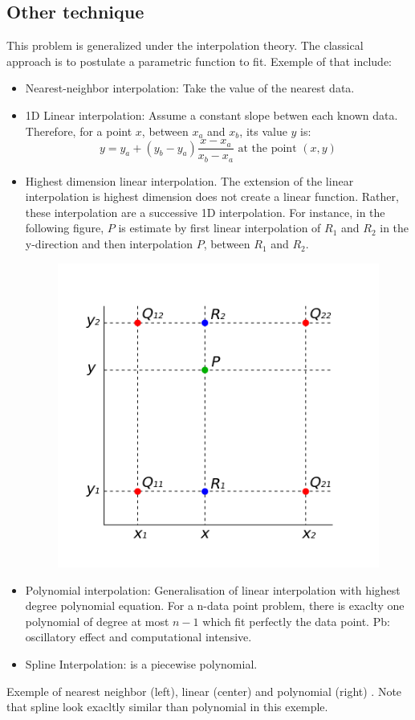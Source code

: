 \documentclass[twocolumn]{article}
\numberwithin{equation}{section}
\begin{document}
\subsection{Other technique}
This problem is generalized under the interpolation theory. The classical approach is to postulate a parametric function to fit. Exemple of that include:
\begin{itemize}
\item Nearest-neighbor interpolation: Take the value of the nearest data.
\item 1D Linear interpolation: Assume a constant slope betwen each known data. Therefore, for a point $x$, between $x_a$ and $x_b$, its value $y$ is:
$$ y = y_a + \left( y_b-y_a \right) \frac{x-x_a}{x_b-x_a} \text{ at the point } \left( x,y \right) $$
\item Highest dimension linear interpolation. The extension of the linear interpolation is highest dimension does not create a linear function. Rather, these interpolation are a successive 1D interpolation. For instance, in the following figure, $P$ is estimate by first linear interpolation of $R_1$ and $R_2$ in the y-direction and then interpolation $P$, between $R_1$ and $R_2$.
\begin{figure}[H]
	\centering
	\includegraphics[width=.2\textwidth]{Images/BilinearInterpolation.png}
\end{figure}
\item Polynomial interpolation: Generalisation of linear interpolation with highest degree polynomial equation. For a n-data point problem, there is exaclty one polynomial of degree at most $n-1$ which fit perfectly the data point. Pb: oscillatory effect and computational intensive.
\item Spline Interpolation: is a piecewise polynomial. 
\end{itemize}
Exemple of nearest neighbor (left), linear (center) and polynomial (right) . Note that spline look exacltly similar than polynomial in this exemple.
\end{document}
